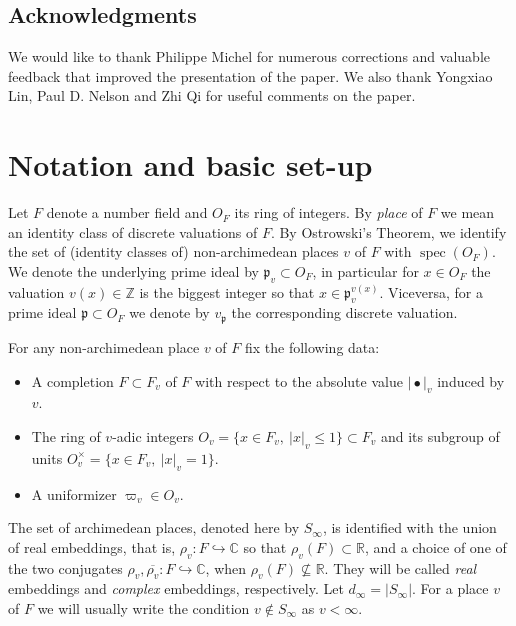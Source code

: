 \documentclass[a4paper,11pt]{amsart}
\theoremstyle{definition}
\newcommand{\R}{\mathbb{R}}
\newcommand{\Z}{\mathbb{Z}}
\newcommand{\CC}{\mathbb{C}}
\begin{document}
\subsection*{Acknowledgments}
We would like to thank Philippe Michel for numerous corrections and valuable feedback that improved the presentation of the paper. We also thank Yongxiao Lin, Paul D. Nelson and Zhi Qi for useful comments on the paper. 





\section{Notation and basic set-up}\label{sec:Notation and basic set-up} Let $F$ denote a number field and $O_F$ its ring of integers. By \emph{place} of $F$ we mean an identity class of discrete valuations of $F$. By Ostrowski's Theorem, we identify the set of (identity classes of) non-archimedean places $v$ of $F$ with $\operatorname{spec}(O_F)$. We denote the underlying prime ideal by $\mathfrak{p}_v \subset O_F$, in particular for $x\in O_F$ the valuation $v(x) \in \Z$ is the biggest integer so that $x\in \mathfrak{p}_v^{v(x)}$. Viceversa, for a prime ideal $\mathfrak{p} \subset O_F$ we denote by $v_{\mathfrak{p}}$ the corresponding discrete valuation.

 For any  non-archimedean place $v$ of $F$ fix the following data:\begin{itemize}\item A completion $F\subset F_v$ of $F$ with respect to the absolute value $\vert{\bullet}\vert_v$ induced by $v$.  \item The ring of $v$-adic integers $O_{v} = \{x \in F_v,\ \vert{x}\vert_v\leq 1\} \subset F_v$ and its subgroup of units $O_{v}^{\times}=\{x \in F_v,\ \vert{x}\vert_v=1\}.$
    \item A uniformizer $\varpi_v \in O_v$. 
\end{itemize}

The set of archimedean places, denoted here by $S_{\infty}$, is identified with the union of real embeddings, that is, $\rho_v \colon F \hookrightarrow \CC$ so that $\rho_v(F)\subset \R$, and a choice of one of the two conjugates $\rho_v,\overline{\rho_v}\colon F \hookrightarrow \CC$, when $\rho_v(F) \nsubseteq \R$. They will be called \emph{real} embeddings and \emph{complex} embeddings, respectively. Let $d_{\infty} = \vert{S_{\infty}}\vert$. For a place $v$ of $F$ we will usually write the condition $v\notin S_{\infty}$ as $v<\infty$. 
\end{document}
